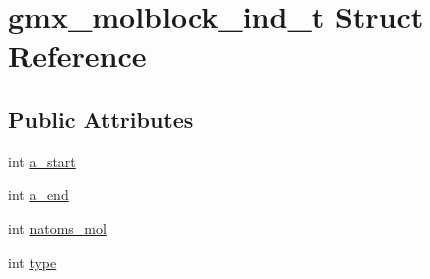 \hypertarget{structgmx__molblock__ind__t}{\section{gmx\-\_\-molblock\-\_\-ind\-\_\-t \-Struct \-Reference}
\label{structgmx__molblock__ind__t}
}
\subsection*{\-Public \-Attributes}
\begin{DoxyCompactItemize}
\item 
int \hyperlink{structgmx__molblock__ind__t_a18012b7c71885f3c6780857b07f95d03}{a\-\_\-start}
\item 
int \hyperlink{structgmx__molblock__ind__t_a7497ca2e90f8b16ae08a498b3cdd011a}{a\-\_\-end}
\item 
int \hyperlink{structgmx__molblock__ind__t_a51d1aa31332d8e6363c88b2799738c73}{natoms\-\_\-mol}
\item 
int \hyperlink{structgmx__molblock__ind__t_ab475692e4cc909fa0f61fde577fe0e0a}{type}
\end{DoxyCompactItemize}


